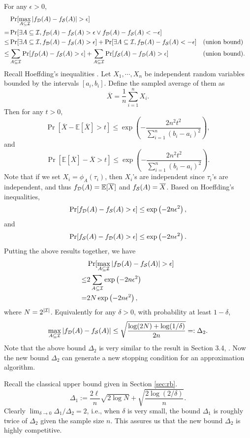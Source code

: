 \documentclass{article}
\begin{document}
For any $\epsilon > 0$,
$$\begin{aligned}
& \Pr[\max_{A\subseteq\I}|f_\D(A)-f_\Smp(A)|>\epsilon] \\
= & \Pr[\exists A\subseteq\I, f_\D(A)-f_\Smp(A)>\epsilon \vee f_\D(A)-f_\Smp(A)<-\epsilon] \\
\leq & \Pr[\exists A\subseteq\I, f_\D(A)-f_\Smp(A)>\epsilon] +\Pr[\exists A\subseteq\I, f_\D(A)-f_\Smp(A)<-\epsilon] && \textrm{(union bound)}\\
\leq & \sum_{A\subseteq\I} \Pr[f_\D(A)-f_\Smp(A)>\epsilon] + \sum_{A\subseteq\I} \Pr[f_\Smp(A)-f_\D(A)>\epsilon] && \textrm{(union bound)}.
\end{aligned}$$
Recall Hoeffding's inequalities \cite{H63}. Let $X_1, \cdots, X_n$ be independent random variables bounded by the intervals $[a_i, b_i]$. Define the sampled average of them as
$$\overline{X} = \frac{1}{n}\sum_{i=1}^n X_i.$$
Then for any $t>0$,
$$\Pr[\overline{X} - \mathbb{E}[\overline{X}] > t] \leq \exp\left(-\frac{2n^2t^2}{\sum_{i=1}^n (b_i-a_i)^2}\right),$$
and
$$\Pr[\mathbb{E}[\overline{X}] - \overline{X} > t] \leq \exp\left(-\frac{2n^2t^2}{\sum_{i=1}^n (b_i-a_i)^2}\right).$$
Note that if we set $X_i = \phi_A(\tau_i)$, then $X_i$'s are independent since $\tau_i$'s are independent, and thus $f_{\mathcal{D}}(A) = \mathbb{E}[\overline{X}]$ and $f_{\mathcal{S}}(A) = \overline{X}$. Based on Hoeffding's inequalities, 
$$\Pr[f_{\mathcal{D}}(A) - f_{\mathcal{S}}(A) > \epsilon] \leq \exp\left(-2n\epsilon^2\right),$$
and
$$\Pr[f_{\mathcal{S}}(A) - f_{\mathcal{D}}(A) > \epsilon] \leq \exp\left(-2n\epsilon^2\right).$$
Putting the above results together, we have
$$\begin{aligned}
& \Pr[\max_{A\subseteq\I}|f_\D(A)-f_\Smp(A)|>\epsilon] \\
\leq & 2\sum_{A\subseteq\I} \exp\left(-2n\epsilon^2\right) \\
= & 2N \exp\left(-2n\epsilon^2\right),
\end{aligned}$$
where $N = 2^{|\mathcal{I}|}$. 
Equivalently for any $\delta>0$, with probability at least $1-\delta$,
$$\max_{A\subseteq\mathcal{I}}|f_{\mathcal{D}}(A)-f_{\mathcal{S}}(A)| \leq \sqrt{\frac{\log(2N) + \log(1/\delta)}{2n}} =: \Delta_2.$$
Note that the above bound $\Delta_2$ is very similar to the result in Section 3.4, \cite{BBL04}. Now the new bound $\Delta_2$ can generate a new stopping condition for an approximation algorithm.

Recall the classical upper bound given in Section \ref{sec:rb}.
$$\Delta_1 := \frac{2\ell}{n}\sqrt{2\log N} + \sqrt{\frac{2\log(2/\delta)}{n}}.$$
Clearly $\lim_{\delta\to 0}\Delta_1/\Delta_2 = 2$, i.e., when $\delta$ is very small, the bound $\Delta_1$ is roughly twice of $\Delta_2$ given the sample size $n$.
This assures us that the new bound $\Delta_2$ is highly competitive.
\end{document}
